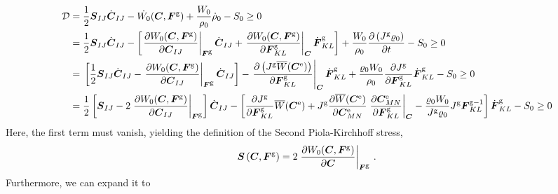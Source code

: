 \documentclass[10pt,letterpaper,oneside]{report}
\newcommand{\ten}[1]{\mbox{\boldmath $#1$}{}}
\newcommand{\scas}[1]{\mbox{{\scriptsize{${\rm{#1}}$}}}{}}
\newcommand{\tens}[1]{\mbox{\boldmath{\scriptsize{$#1$}}}{}}
\begin{document}
\begin{align}
\mathcal{D} ={}& \frac{1}{2} \ten{S}_{IJ} \dot{\ten{C}}_{IJ} - \dot{W_0} ( \ten{C}, \ten{F}^{\scas{g}} ) + \frac{W_0}{\rho_0} \dot{\rho}_0 - S_0 \geq 0
\notag 
\\
={}& \frac{1}{2} \ten{S}_{IJ} \dot{\ten{C}}_{IJ} - \left[ \left. \frac{ \partial W_0 ( \ten{C}, \ten{F}^{\scas{g}} )}{\partial \ten{C}_{IJ} } \right|_{\tens{F}^{\scas{g}}} \dot{\ten{C}}_{IJ} + \left. \frac{ \partial W_0 ( \ten{C}, \ten{F}^{\scas{g}} )}{\partial \ten{F}^{\scas{g}}_{KL} } \right|_{\tens{C}} \dot{\ten{F}}^{\scas{g}}_{KL} \right] + \frac{W_0}{\rho_0} \frac{ \partial \left( J^{\scas{g}} \varrho_0 \right) }{\partial t} - S_0 \geq 0
\notag 
\\
={}& \left[ \frac{1}{2} \ten{S}_{IJ} \dot{\ten{C}}_{IJ} - \left. \frac{ \partial W_0 ( \ten{C}, \ten{F}^{\scas{g}} )}{\partial \ten{C}_{IJ} } \right|_{\tens{F}^{\scas{g}}} \dot{\ten{C}}_{IJ} \right] - \left. \frac{ \partial \left( J^{\scas{g}} \overline{W} ( \ten{C}^{\scas{e}} ) \right) }{\partial \ten{F}^{\scas{g}}_{KL} } \right|_{\tens{C}} \dot{\ten{F}}^{\scas{g}}_{KL} + \frac{\varrho_0 W_0}{\rho_0} \frac{ \partial J^{\scas{g}} }{\partial \ten{F}^{\scas{g}}_{KL}} \dot{\ten{F}}^{\scas{g}}_{KL} - S_0 \geq 0
\notag 
\\
={}& \frac{1}{2} \left[ \ten{S}_{IJ} - 2 \left. \frac{ \partial W_0 ( \ten{C}, \ten{F}^{\scas{g}} )}{\partial \ten{C}_{IJ} } \right|_{\tens{F}^{\scas{g}}} \right] \dot{\ten{C}}_{IJ} 
- \left[ 
  \frac{ \partial J^{\scas{g}}  }{\partial \ten{F}^{\scas{g}}_{KL} } \overline{W} ( \ten{C}^{\scas{e}} )
+ J^{\scas{g}} \frac{ \partial \overline{W} ( \ten{C}^{\scas{e}} ) }{\partial \ten{C}^{\scas{e}}_{MN} } \left. \frac{ \partial \ten{C}^{\scas{e}}_{MN} }{\partial \ten{F}^{\scas{g}}_{KL} }\right|_{\tens{C}} - \frac{\varrho_0 W_0}{J^{\scas{g}} \varrho_0} J^{\scas{g}} \ten{F}^{\scas{g}-1}_{KL} 
\right] \dot{\ten{F}}^{\scas{g}}_{KL} - S_0 \geq 0
\notag 
\end{align}
Here, the first term must vanish, yielding the definition of the Second Piola-Kirchhoff stress,
\begin{equation}
\ten{S} \left( \ten{C}, \ten{F}^{\scas{g}} \right) = 2 \left. \frac{\partial W_0 ( \ten{C}, \ten{F}^{\scas{g}}) }{\partial \ten{C}} \right|_{\tens{F}^{\scas{g}}} \, .
\label{SPK_ref}
\end{equation}
Furthermore, we can expand it to 
\end{document}
